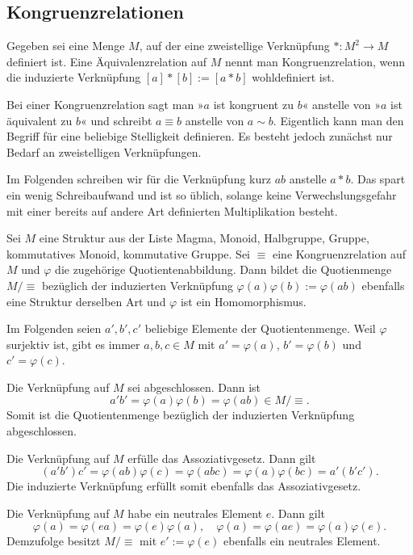 \subsection{Kongruenzrelationen}

\begin{Definition}[Kongruenzrelation]%
\newlinefirst
Gegeben sei eine Menge $M$, auf der eine zweistellige
Verknüpfung $*\colon M^2\to M$ definiert ist. Eine Äquivalenzrelation
auf $M$ nennt man Kongruenzrelation, wenn die induzierte Verknüpfung
$[a]*[b]:=[a*b]$ wohldefiniert ist.
\end{Definition}
Bei einer Kongruenzrelation sagt man »$a$ ist kongruent zu $b$«
anstelle von »$a$ ist äquivalent zu $b$« und schreibt $a\equiv b$
anstelle von $a\sim b$. Eigentlich kann man den Begriff für eine
beliebige Stelligkeit definieren. Es besteht jedoch zunächst nur Bedarf
an zweistelligen Verknüpfungen.

Im Folgenden schreiben wir für die Verknüpfung kurz $ab$ anstelle
$a*b$. Das spart ein wenig Schreibaufwand und ist so üblich, solange
keine Verwechslungsgefahr mit einer bereits auf andere Art definierten
Multiplikation besteht.

\begin{Satz}\label{Kongruenz-Quotient}
Sei $M$ eine Struktur aus der Liste Magma, Monoid, Halbgruppe,
Gruppe, kommutatives Monoid, kommutative Gruppe. Sei $\equiv$ eine
Kongruenzrelation auf $M$ und $\varphi$ die zugehörige
Quotientenabbildung. Dann bildet die Quotienmenge $M/\equiv$
bezüglich der induzierten Verknüpfung $\varphi(a)\varphi(b):=\varphi(ab)$
ebenfalls eine Struktur derselben Art und $\varphi$ ist ein
Homomorphismus.
\end{Satz}
 Im Folgenden seien $a',b',c'$ beliebige Elemente
der Quotientenmenge. Weil $\varphi$ surjektiv ist, gibt es immer
$a,b,c\in M$ mit $a'=\varphi(a)$, $b'=\varphi(b)$ und $c'=\varphi(c)$.

Die Verknüpfung auf $M$ sei abgeschlossen. Dann ist
\[a'b' = \varphi(a)\varphi(b) = \varphi(ab)\in M/\equiv.\]
Somit ist die Quotientenmenge bezüglich der induzierten Verknüpfung
abgeschlossen.

Die Verknüpfung auf $M$ erfülle das Assoziativgesetz. Dann gilt
\[(a'b')c' = \varphi(ab)\varphi(c) = \varphi(abc)
= \varphi(a)\varphi(bc) = a'(b'c').\]
Die induzierte Verknüpfung erfüllt somit ebenfalls das
Assoziativgesetz.

Die Verknüpfung auf $M$ habe ein neutrales Element $e$. Dann gilt
\[\varphi(a)=\varphi(ea) = \varphi(e)\varphi(a),\quad
\varphi(a)=\varphi(ae)=\varphi(a)\varphi(e).\]
Demzufolge besitzt $M/\equiv$ mit $e':=\varphi(e)$ ebenfalls
ein neutrales Element.

